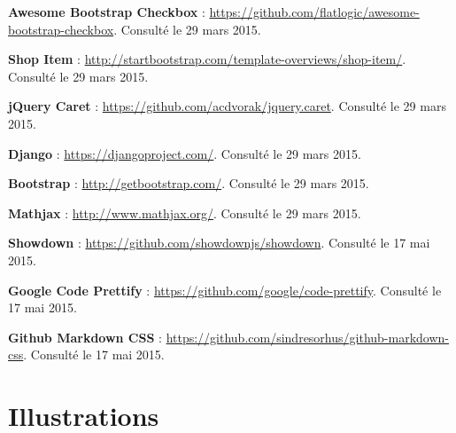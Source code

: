 \documentclass[a4,10pt,french]{sphinxmanual}
\begin{document}
\textbf{Awesome Bootstrap Checkbox} : \href{https://github.com/flatlogic/awesome-bootstrap-checkbox}{https://github.com/flatlogic/awesome-bootstrap-checkbox}. Consulté le 29 mars 2015.

\textbf{Shop Item} : \href{http://startbootstrap.com/template-overviews/shop-item/}{http://startbootstrap.com/template-overviews/shop-item/}. Consulté le 29 mars 2015.

\textbf{jQuery Caret} : \href{https://github.com/acdvorak/jquery.caret}{https://github.com/acdvorak/jquery.caret}. Consulté le 29 mars 2015.

\textbf{Django} : \href{https://djangoproject.com/}{https://djangoproject.com/}. Consulté le 29 mars 2015.

\textbf{Bootstrap} : \href{http://getbootstrap.com/}{http://getbootstrap.com/}. Consulté le 29 mars 2015.

\textbf{Mathjax} : \href{http://www.mathjax.org/}{http://www.mathjax.org/}. Consulté le 29 mars 2015.

\textbf{Showdown} : \href{https://github.com/showdownjs/showdown}{https://github.com/showdownjs/showdown}. Consulté le 17 mai 2015.

\textbf{Google Code Prettify} : \href{https://github.com/google/code-prettify}{https://github.com/google/code-prettify}. Consulté le 17 mai 2015.

\textbf{Github Markdown CSS} : \href{https://github.com/sindresorhus/github-markdown-css}{https://github.com/sindresorhus/github-markdown-css}. Consulté le 17 mai 2015.


\section{Illustrations}
\label{end:illustrations}\begingroup
\let\clearpage\relax
\renewcommand*\listfigurename{Table des illustrations}
\listoffigures
\endgroup
\end{document}
